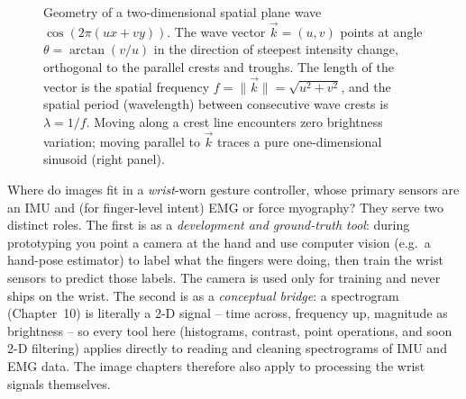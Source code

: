 \begin{figure}[H]
\caption{Geometry of a two-dimensional spatial plane wave $\cos(2\pi(ux + vy))$. The wave vector $\vec{k} = (u,v)$ points at angle $\theta = \arctan(v/u)$ in the direction of steepest intensity change, orthogonal to the parallel crests and troughs. The length of the vector is the spatial frequency $f = \|\vec{k}\| = \sqrt{u^2+v^2}$, and the spatial period (wavelength) between consecutive wave crests is $\lambda = 1/f$. Moving along a crest line encounters zero brightness variation; moving parallel to $\vec{k}$ traces a pure one-dimensional sinusoid (right panel).}
\label{ch30:fig-plane-wave}
\end{figure}

\begin{goalbox}
Where do images fit in a \emph{wrist}-worn gesture controller, whose primary
sensors are an IMU and (for finger-level intent) EMG or force myography? They serve
two distinct roles. The first is as a \emph{development and ground-truth
tool}: during prototyping you point a camera at the hand and use computer vision
(e.g.\ a hand-pose estimator) to label what the fingers were doing, then
train the wrist sensors to predict those labels. The camera is used only for training and never ships on the
wrist. The second is as a \emph{conceptual
bridge}: a
spectrogram (Chapter~10) is literally a 2-D signal -- time across,
frequency up, magnitude as brightness -- so every tool here (histograms, contrast,
point operations, and soon 2-D filtering) applies directly to reading and cleaning
spectrograms of IMU and EMG data. The image chapters therefore also apply to
processing the wrist signals themselves.
\end{goalbox}

